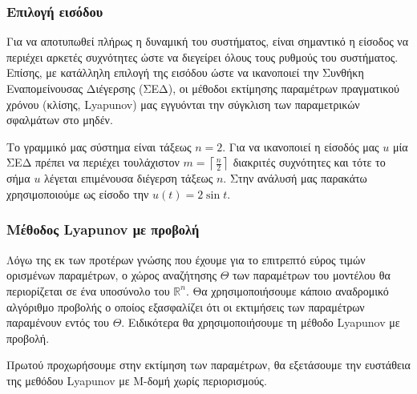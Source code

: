 \documentclass[a4paper,12pt]{article}
\begin{document}
\subsubsection*{Επιλογή εισόδου}

Για να αποτυπωθεί πλήρως η δυναμική του συστήματος, είναι σημαντικό η είσοδος να περιέχει αρκετές
συχνότητες ώστε να διεγείρει όλους τους ρυθμούς του συστήματος. Επίσης, με κατάλληλη επιλογή της
εισόδου ώστε να ικανοποιεί την Συνθήκη Εναπομείνουσας Διέγερσης (ΣΕΔ), οι μέθοδοι εκτίμησης παραμέτρων 
πραγματικού χρόνου (κλίσης, Lyapunov) μας εγγυόνται την 
σύγκλιση των παραμετρικών σφαλμάτων στο μηδέν.

Το γραμμικό μας σύστημα είναι τάξεως $n=2$. Για να ικανοποιεί η είσοδός μας $u$ μία ΣΕΔ πρέπει
να περιέχει τουλάχιστον $m = \left\lceil \frac{n}{2} \right\rceil$ διακριτές συχνότητες και τότε
το σήμα $u$ λέγεται επιμένουσα διέγερση τάξεως $n$. Στην ανάλυσή μας παρακάτω χρησιμοποιούμε ως είσοδο
την $u(t) = 2 \sin t$.

\subsubsection*{Μέθοδος Lyapunov με προβολή}
Λόγω της εκ των προτέρων γνώσης που έχουμε για το επιτρεπτό εύρος τιμών ορισμένων παραμέτρων, 
ο χώρος αναζήτησης $\Theta$ των παραμέτρων του μοντέλου θα περιορίζεται σε ένα υποσύνολο του $\mathbb{R}^n$.
Θα χρησιμοποιήσουμε κάποιο αναδρομικό αλγόριθμο προβολής ο οποίος εξασφαλίζει ότι οι εκτιμήσεις των
παραμέτρων παραμένουν εντός του $\Theta$. Ειδικότερα θα χρησιμοποιήσουμε τη μέθοδο 
Lyapunov με προβολή.

Πρωτού προχωρήσουμε στην εκτίμηση των παραμέτρων, θα εξετάσουμε την ευστάθεια της μεθόδου 
Lyapunov με Μ-δομή χωρίς περιορισμούς.
\end{document}
